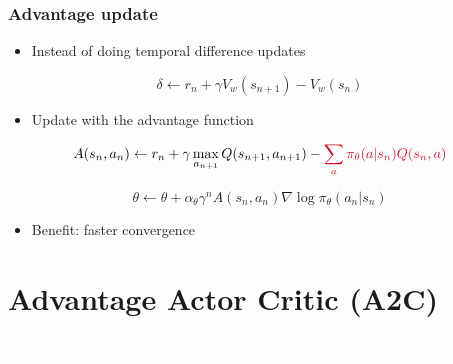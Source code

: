 \documentclass[11pt,table]{beamer}
\begin{document}
\begin{frame}
\frametitle{Advantage update}

\begin{itemize}
    \item Instead of doing temporal difference updates
\end{itemize}

\[
\delta \leftarrow r_n + \gamma V_w(s_{n+1}) - V_w(s_n)
\]

\vspace{0.5em}

\begin{itemize}
    \item Update with the advantage function
\end{itemize}

\[
A(s_n, a_n) \leftarrow r_n + \gamma \max_{a_{n+1}} Q(s_{n+1}, a_{n+1}) - \textcolor{red1}{\sum_a \pi_\theta(a|s_n) Q(s_n, a)}
\]

\[
\theta \leftarrow \theta + \alpha_\theta \gamma^n A(s_n, a_n) \nabla \log \pi_\theta(a_n|s_n)
\]

\vspace{0.5em}

\begin{itemize}
    \item Benefit: faster convergence
\end{itemize}

\end{frame}


\section{Advantage Actor Critic (A2C)}
{
\begin{frame}
\centering
\Huge
\textcolor{white}{Advantage Actor Critic (A2C)}
\thispagestyle{empty}
\end{frame}
}
\end{document}
